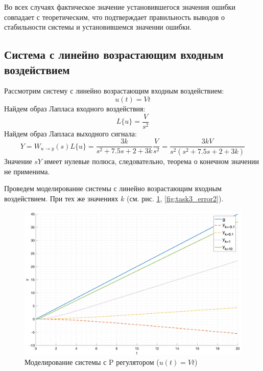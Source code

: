 
Во всех случаях фактическое значение установившегося значения ошибки совпадает с теоретическим, что 
подтверждает правильность выводов о стабильности системы и установившемся значении ошибки. 

\subsection{Система с линейно возрастающим входным воздействием}
Рассмотрим систему с линейно возрастающим входным воздействием:
\begin{equation}
    u(t) = Vt
\end{equation}
Найдем образ Лапласа входного воздействия:
\begin{equation}
    L\{u\} = \frac{V}{s^2}
\end{equation}
Найдем образ Лапласа выходного сигнала:
\begin{equation}
    Y = W_{u\rightarrow y}(s)L\{u\} = \frac{3k}{s^2 + 7.5s + 2 + 3k}\frac{V}{s^2} = \frac{3kV}{s^2(s^2 + 7.5s + 2 + 3k)}
\end{equation}
Значение $sY$ имеет нулевые полюса, следовательно, теорема о конечном значении не применима.

Проведем моделирование системы с линейно возрастающим входным воздействием. При тех же 
значениях $k$ (см. рис. \ref{fig:task3_out2}, \ref{fig:task3_error2}).

\begin{figure}
    \centering
    \includegraphics[width=\textwidth]{"media/plots/task3_out2.png"}
    \caption{Моделирование системы с P регулятором ($u(t) = Vt$)}
    \label{fig:task3_out2}
\end{figure}

